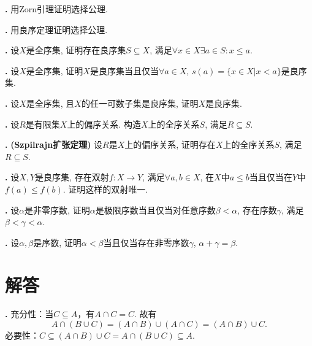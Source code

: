 \par \textbf{\theprobset .} 用Zorn引理证明选择公理. 

\par \textbf{\theprobset .} 用良序定理证明选择公理.


\par \textbf{\theprobset .} \cite{NST}设$X$是全序集, 证明存在良序集$S\subseteq X$, 满足$\forall x\in X\exists a\in S: x\le a$. 

\par \textbf{\theprobset .} \cite{NST}设$X$是全序集, 证明$X$是良序集当且仅当$\forall a\in X$, $s(a)=\{x\in X\vert x<a\}$是良序集. 

\par \textbf{\theprobset .} \cite{NST} 设$X$是全序集, 且$X$的任一可数子集是良序集, 证明$X$是良序集. 

\par \textbf{\theprobset .} \cite{IC} 设$R$是有限集$X$上的偏序关系. 构造$X$上的全序关系$S$, 满足$R\subseteq S$. 

\par \textbf{\theprobset .} \textbf{(Szpilrajn扩张定理)} 设$R$是$X$上的偏序关系, 证明存在$X$上的全序关系$S$, 满足$R\subseteq S$. 

\par \textbf{\theprobset .} \cite{NST}设$X,Y$是良序集, 存在双射$f:X\to Y$, 满足$\forall a,b\in X$, 在$X$中$a\le b$当且仅当在$Y$中$f(a)\le f(b)$. 证明这样的双射唯一. 

\par \textbf{\theprobset .} 设$\alpha$是非零序数, 证明$\alpha$是极限序数当且仅当对任意序数$\beta<\alpha$, 存在序数$\gamma$, 满足$\beta<\gamma<\alpha$. 

\par \textbf{\theprobset .} \cite{NST}设$\alpha,\beta$是序数, 证明$\alpha<\beta$当且仅当存在非零序数$\gamma$, $\alpha+\gamma=\beta$. 

\section*{解答}
\par \textbf{\thesolset .} 充分性：当$C\subseteq A$，有$A\cap C=C$. 故有
\begin{equation*}
    A\cap (B \cup C)=(A\cap B)\cup (A\cap C)=(A\cap B)\cup C.
\end{equation*} 
必要性：$C\subseteq (A\cap B)\cup C =  A\cap (B \cup C) \subseteq A$.

